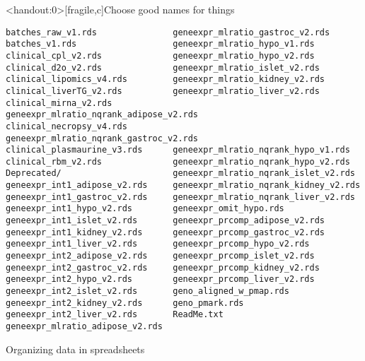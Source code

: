 \documentclass[aspectratio=169,12pt,t]{beamer}
\begin{document}
\begin{frame}<handout:0>[fragile,c]{Choose good names for things}


\begin{center}
\begin{minipage}[c]{9.5cm}
\begin{semiverbatim}
\lstset{basicstyle=\tiny}
\begin{lstlisting}[escapechar=!,linewidth=9.5cm]
batches_raw_v1.rds               geneexpr_mlratio_gastroc_v2.rds
batches_v1.rds                   geneexpr_mlratio_hypo_v1.rds
clinical_cpl_v2.rds              geneexpr_mlratio_hypo_v2.rds
clinical_d2o_v2.rds              geneexpr_mlratio_islet_v2.rds
clinical_lipomics_v4.rds         geneexpr_mlratio_kidney_v2.rds
clinical_liverTG_v2.rds          geneexpr_mlratio_liver_v2.rds
clinical_mirna_v2.rds            geneexpr_mlratio_nqrank_adipose_v2.rds
clinical_necropsy_v4.rds         geneexpr_mlratio_nqrank_gastroc_v2.rds
clinical_plasmaurine_v3.rds      geneexpr_mlratio_nqrank_hypo_v1.rds
clinical_rbm_v2.rds              geneexpr_mlratio_nqrank_hypo_v2.rds
Deprecated/                      geneexpr_mlratio_nqrank_islet_v2.rds
geneexpr_int1_adipose_v2.rds     geneexpr_mlratio_nqrank_kidney_v2.rds
geneexpr_int1_gastroc_v2.rds     geneexpr_mlratio_nqrank_liver_v2.rds
geneexpr_int1_hypo_v2.rds        geneexpr_omit_hypo.rds
geneexpr_int1_islet_v2.rds       geneexpr_prcomp_adipose_v2.rds
geneexpr_int1_kidney_v2.rds      geneexpr_prcomp_gastroc_v2.rds
geneexpr_int1_liver_v2.rds       geneexpr_prcomp_hypo_v2.rds
geneexpr_int2_adipose_v2.rds     geneexpr_prcomp_islet_v2.rds
geneexpr_int2_gastroc_v2.rds     geneexpr_prcomp_kidney_v2.rds
geneexpr_int2_hypo_v2.rds        geneexpr_prcomp_liver_v2.rds
geneexpr_int2_islet_v2.rds       geno_aligned_w_pmap.rds
geneexpr_int2_kidney_v2.rds      geno_pmark.rds
geneexpr_int2_liver_v2.rds       ReadMe.txt
geneexpr_mlratio_adipose_v2.rds
\end{lstlisting}
\end{semiverbatim}
\end{minipage}
\end{center}


\end{frame}




\begin{frame}[c]{Organizing data in spreadsheets}





  \note{}
\end{frame}
\end{document}
